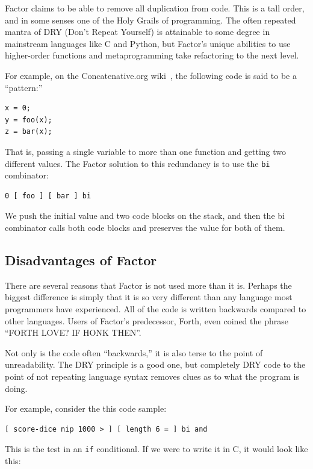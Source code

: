 \documentclass{article}
\begin{document}
Factor claims to be able to remove all duplication from code.  This is a tall
order, and in some senses one of the Holy Grails of programming.  The often
repeated mantra of DRY (Don't Repeat Yourself) is attainable to some degree in
mainstream languages like C and Python, but Factor's unique abilities to use
higher-order functions and metaprogramming take refactoring to the next level.

For example, on the Concatenative.org wiki~\cite{factorwiki}, the following code
is said to be a ``pattern:''

\begin{verbatim}
x = 0;
y = foo(x);
z = bar(x);
\end{verbatim}

That is, passing a single variable to more than one function and getting two
different values.  The Factor solution to this redundancy is to use the
\texttt{bi} combinator:

\begin{verbatim}
0 [ foo ] [ bar ] bi
\end{verbatim}

We push the initial value and two code blocks on the stack, and then the bi
combinator calls both code blocks and preserves the value for both of them.

\subsection{Disadvantages of Factor}

There are several reasons that Factor is not used more than it is.  Perhaps the
biggest difference is simply that it is so very different than any language most
programmers have experienced.  All of the code is written backwards compared to
other languages.  Users of Factor's predecessor, Forth, even coined the phrase
``FORTH LOVE? IF HONK THEN''.

Not only is the code often ``backwards,'' it is also terse to the point of
unreadability.  The DRY principle is a good one, but completely DRY code to the
point of not repeating language syntax removes clues as to what the program is
doing.

For example, consider the this code sample:

\begin{verbatim}
[ score-dice nip 1000 > ] [ length 6 = ] bi and
\end{verbatim}

This is the test in an \texttt{if} conditional.  If we were to write it in C, it
would look like this:
\end{document}
